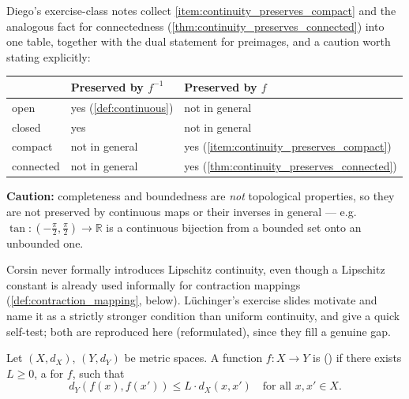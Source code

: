 \begin{remark}
Diego's exercise-class notes collect \cref{item:continuity_preserves_compact} and the analogous
fact for connectedness (\cref{thm:continuity_preserves_connected}) into one table, together with
the dual statement for preimages, and a caution worth stating explicitly:
\begin{center}
\begin{tabular}{lll}
& \textbf{Preserved by $f^{-1}$} & \textbf{Preserved by $f$} \\
\hline
open & yes (\cref{def:continuous}) & not in general \\
closed & yes & not in general \\
compact & not in general & yes (\cref{item:continuity_preserves_compact}) \\
connected & not in general & yes (\cref{thm:continuity_preserves_connected}) \\
\end{tabular}
\end{center}
\textbf{Caution:} completeness and boundedness are \emph{not} topological properties, so they
are not preserved by continuous maps or their inverses in general --- e.g.\ $\tan :
(-\tfrac\pi2,\tfrac\pi2) \to \mathbb{R}$ is a continuous bijection from a bounded set onto an
unbounded one.
\end{remark}

\begin{ainote}
Corsin never formally introduces Lipschitz continuity, even though a Lipschitz
constant is already used informally for contraction mappings
(\cref{def:contraction_mapping}, below). Lüchinger's exercise slides motivate and name it as a
strictly stronger condition than uniform continuity, and give a quick self-test; both are
reproduced here (reformulated), since they fill a genuine gap.
\end{ainote}

\begin{definition}
\label{def:lipschitz_continuous}
Let $(X,d_X)$, $(Y,d_Y)$ be metric spaces. A function $f : X \to Y$ is  () if there exists $L \geq 0$, a  for $f$, such that
\[d_Y(f(x),f(x')) \leq L\cdot d_X(x,x') \quad \text{for all } x,x' \in X.\]
\end{definition}

